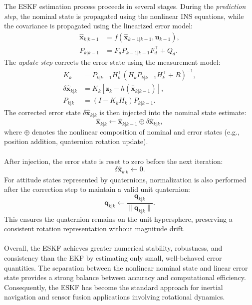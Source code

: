 \\ \\
The ESKF estimation process proceeds in several stages. During the \textit{prediction step}, the nominal state is propagated using the nonlinear INS equations, while the covariance is propagated using the linearized error model:
$$
\begin{aligned}
    \hat{\mathbf{x}}_{k|k-1} &= f(\hat{\mathbf{x}}_{k-1|k-1}, \mathbf{u}_{k-1}), \\
    P_{k|k-1} &= F_d P_{k-1|k-1} F_d^\top + Q_d.
\end{aligned}
$$
The \textit{update step} corrects the error state using the measurement model:
$$
\begin{aligned}
    K_k &= P_{k|k-1} H_k^\top (H_k P_{k|k-1} H_k^\top + R)^{-1}, \\
    \delta\hat{\mathbf{x}}_{k|k} &= K_k [\mathbf{z}_k - h(\hat{\mathbf{x}}_{k|k-1})], \\
    P_{k|k} &= (I - K_k H_k) P_{k|k-1}.
\end{aligned}
$$
The corrected error state $\delta\hat{\mathbf{x}}_{k|k}$ is then injected into the nominal state estimate:
$$
    \hat{\mathbf{x}}_{k|k} \leftarrow \hat{\mathbf{x}}_{k|k-1} \oplus \delta\hat{\mathbf{x}}_{k|k},
$$
where $\oplus$ denotes the nonlinear composition of nominal and error states (e.g., position addition, quaternion rotation update).  
\\ \\
After injection, the error state is reset to zero before the next iteration:
$$
    \delta\hat{\mathbf{x}}_{k|k} \leftarrow 0.
$$
For attitude states represented by quaternions, normalization is also performed after the correction step to maintain a valid unit quaternion:
$$
    \mathbf{q}_{k|k} \leftarrow \frac{\mathbf{q}_{k|k}}{\|\mathbf{q}_{k|k}\|}.
$$
This ensures the quaternion remains on the unit hypersphere, preserving a consistent rotation representation without magnitude drift.  
\\ \\
Overall, the ESKF achieves greater numerical stability, robustness, and consistency than the EKF by estimating only small, well-behaved error quantities. The separation between the nonlinear nominal state and linear error state provides a strong balance between accuracy and computational efficiency. Consequently, the ESKF has become the standard approach for inertial navigation and sensor fusion applications involving rotational dynamics.
\\ \\
